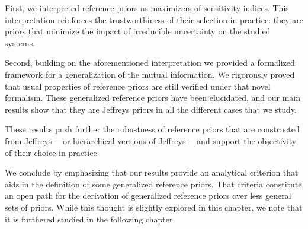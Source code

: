 First, we interpreted reference priors as maximizers of sensitivity indices. This interpretation reinforces the trustworthiness of their selection in practice: they are  priors that minimize the impact of irreducible uncertainty on the studied systems. %

Second, building on the aforementioned interpretation 
we provided a formalized framework for a generalization of the mutual information. We rigorously proved that usual properties of reference priors are still verified under that novel formalism. These generalized reference priors have been elucidated, and our main results show that they are Jeffreys priors in all the different cases that we study.

These results
push further the robustness of reference priors that are constructed from Jeffreys ---or hierarchical versions of Jeffreys--- and support the objectivity of their choice in practice.


We conclude by emphasizing that our results provide  an analytical criterion that aids in the definition of some generalized reference priors.
That criteria constitute an open path for the derivation of generalized reference priors over less general sets of priors.
While this thought is slightly explored in this chapter, we note that it is furthered studied in the following chapter.












